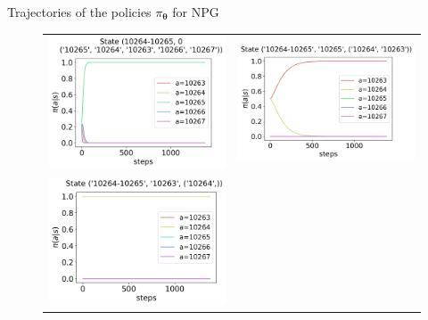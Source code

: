 \documentclass[10pt, aspectratio=169, compress, protectframetitle, handout]{beamer}
\begin{document}
\begin{frame}{Trajectories of the policies $\pi_{\boldsymbol \theta}$ for NPG}

    \begin{figure}
        \centering
        \begin{tabular}{cc}
            \includegraphics[scale=0.34,valign=b]{figures/policy_NPG_state_0.png} &
            \includegraphics[scale=0.34,valign=b]{figures/policy_NPG_state_1.png} \\
            \hspace*{-5pt}\includegraphics[scale=0.34,valign=b]{figures/policy_NPG_state_2.png} &

\end{tabular}
\end{figure}
\end{frame}
\end{document}
